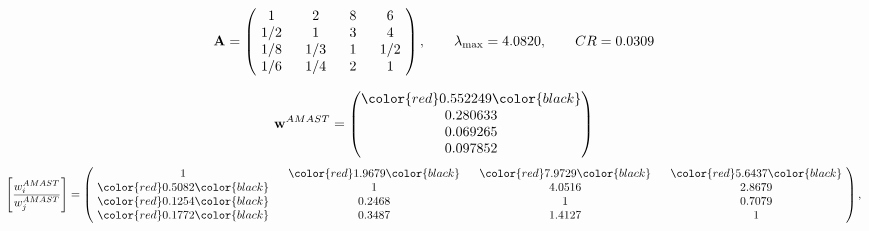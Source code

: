 \begin{example}
\begin{equation*}
\mathbf{A} =
\begin{pmatrix}
$\,\,$ 1 $\,\,$ & $\,\,$2$\,\,$ & $\,\,$8$\,\,$ & $\,\,$6 $\,\,$ \\
$\,\,$ 1/2$\,\,$ & $\,\,$ 1 $\,\,$ & $\,\,$3$\,\,$ & $\,\,$4 $\,\,$ \\
$\,\,$ 1/8$\,\,$ & $\,\,$ 1/3$\,\,$ & $\,\,$ 1 $\,\,$ & $\,\,$ 1/2 $\,\,$ \\
$\,\,$ 1/6$\,\,$ & $\,\,$ 1/4$\,\,$ & $\,\,$2$\,\,$ & $\,\,$ 1  $\,\,$ \\
\end{pmatrix},
\qquad
\lambda_{\max} =
4.0820,
\qquad
CR = 0.0309
\end{equation*}

\begin{equation*}
\mathbf{w}^{AMAST} =
\begin{pmatrix}
\color{red} 0.552249\color{black} \\
0.280633\\
0.069265\\
0.097852
\end{pmatrix}\end{equation*}
\begin{equation*}
\left[ \frac{{w}^{AMAST}_i}{{w}^{AMAST}_j} \right] =
\begin{pmatrix}
$\,\,$ 1 $\,\,$ & $\,\,$\color{red} 1.9679\color{black} $\,\,$ & $\,\,$\color{red} 7.9729\color{black} $\,\,$ & $\,\,$\color{red} 5.6437\color{black} $\,\,$ \\
$\,\,$\color{red} 0.5082\color{black} $\,\,$ & $\,\,$ 1 $\,\,$ & $\,\,$4.0516$\,\,$ & $\,\,$2.8679  $\,\,$ \\
$\,\,$\color{red} 0.1254\color{black} $\,\,$ & $\,\,$0.2468$\,\,$ & $\,\,$ 1 $\,\,$ & $\,\,$0.7079 $\,\,$ \\
$\,\,$\color{red} 0.1772\color{black} $\,\,$ & $\,\,$0.3487$\,\,$ & $\,\,$1.4127$\,\,$ & $\,\,$ 1  $\,\,$ \\
\end{pmatrix},
\end{equation*}


\end{example}
